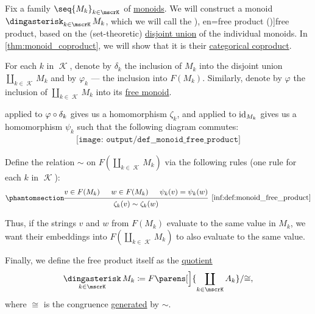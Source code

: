 \begin{definition}\label{def:monoid_free_product}\mimprovised
  Fix a family \( \seq{ M_k }_{k \in \mscrK} \) of \hyperref[def:monoid]{monoids}. We will construct a monoid \( \Ast_{k \in \mscrK} M_k \), which we will call the \term[ru=свободное произведение (\cite[def. X.5.2]{Ляпин1960Полугруппы}), en=free product (\cite[323]{Knapp2016BasicAlgebra})]{free product}, based on the (set-theoretic) \hyperref[def:disjoint_union]{disjoint union} of the individual monoids. In \cref{thm:monoid_coproduct}, we will show that it is their \hyperref[def:discrete_category_limits]{categorical coproduct}.

  For each \( k \) in \( \mscrK \), denote by \( \delta_k \) the inclusion of \( M_k \) into the disjoint union \( \coprod_{k \in \mscrK} M_k \) and by \( \varphi_k \) --- the inclusion into \( F(M_k) \). Similarly, denote by \( \varphi \) the inclusion of \( \coprod_{k \in \mscrK} M_k \) into its \hyperref[def:free_monoid]{free monoid}.

   applied to \( \varphi \bincirc \delta_k \) gives us a homomorphism \( \zeta_k \), and applied to \( \operatorname{id}_{M_k} \) gives us a homomorphism \( \psi_k \) such that the following diagram commutes:
  \begin{equation*}
    \begin{aligned}
      \texttt{[image: output/def\_\_monoid\_free\_product]}
    \end{aligned}
  \end{equation*}

  Define the relation \( {\sim} \) on \( F(\coprod_{k \in \mscrK} M_k) \) via the following rules (one rule for each \( k \) in \( \mscrK \)):
  \begin{equation*}\taglabel[\ensuremath{ \logic{FreeProd}_k }]{inf:def:monoid_free_product}
    \begin{prooftree}
      \hypo{ v \in F(M_k) }
      \hypo{ w \in F(M_k) }
      \hypo{ \psi_k(v) = \psi_k(w) }
      \infer3[\ref{inf:def:monoid_free_product}]{ \zeta_k(v) \sim \zeta_k(w) }.
    \end{prooftree}
  \end{equation*}

  Thus, if the strings \( v \) and \( w \) from \( F(M_k) \) evaluate to the same value in \( M_k \), we want their embeddings into \( F(\coprod_{k \in \mscrK} M_k) \) to also evaluate to the same value.

  Finally, we define the free product itself as the \hyperref[def:first_order_quotient]{quotient}
  \begin{equation}\label{eq:def:monoid_free_product/product}
    \Ast_{k \in \mscrK} M_k \coloneqq F\parens[\Big]{ \coprod_{k \in \mscrK} A_k } / {\cong},
  \end{equation}
  where \( {\cong} \) is the congruence \hyperref[def:first_order_generated_congruence]{generated} by \( {\sim} \).


\end{definition}
